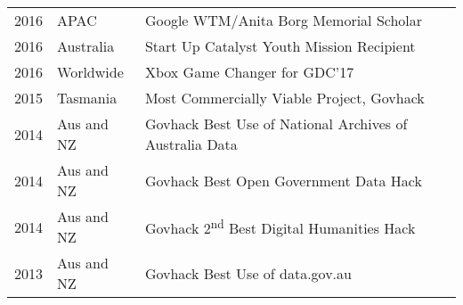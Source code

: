 \documentclass[a4paper]{deedy-resume} %
\begin{document}
\begin{minipage}[t]{0.66\textwidth}
\begin{tabular}{rll}
2016	 & APAC & Google WTM/Anita Borg Memorial Scholar\\
2016	 & Australia & Start Up Catalyst Youth Mission Recipient \\
2016	 & Worldwide & Xbox Game Changer for GDC'17\\
2015	 & Tasmania & Most Commercially Viable Project, Govhack\\
2014	 & Aus and NZ & Govhack Best Use of National Archives of Australia Data \\
2014	 & Aus and NZ & Govhack Best Open Government Data Hack \\
2014	 & Aus and NZ & Govhack 2\textsuperscript{nd} Best Digital Humanities Hack \\
2013	 & Aus and NZ & Govhack Best Use of data.gov.au \\
\end{tabular}

\sectionspace %






\end{minipage} %

\end{document}
